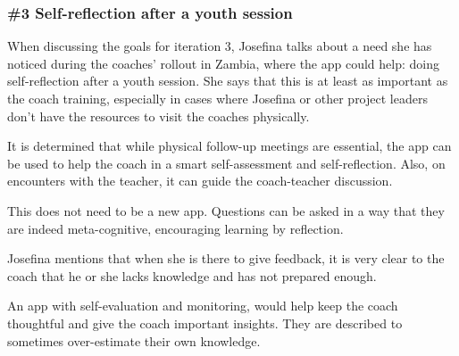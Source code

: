 \subsubsection{\#3 Self-reflection after a youth session}
When discussing the goals for iteration 3, Josefina talks about a need she has noticed during the coaches' rollout in Zambia, where the app could help: doing self-reflection after a youth session. She says that this is at least as important as the coach training, especially in cases where Josefina or other project leaders don't have the resources to visit the coaches physically.

It is determined that while physical follow-up meetings are essential, the app can be used to help the coach in a smart self-assessment and self-reflection. Also, on encounters with the teacher, it can guide the coach-teacher discussion.

This does not need to be a new app. Questions can be asked in a way that they are indeed meta-cognitive, encouraging learning by reflection.

Josefina mentions that when she is there to give feedback, it is very clear to the coach that he or she lacks knowledge and has not prepared enough.

An app with self-evaluation and monitoring, would help keep the coach thoughtful and give the coach important insights. They are described to sometimes over-estimate their own knowledge.
